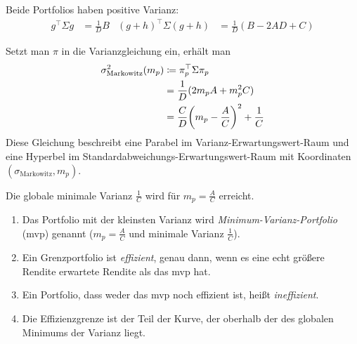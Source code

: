 \documentclass[a4paper,twoside,DIV15,BCOR12mm]{scrbook}
\begin{document}
Beide Portfolios haben positive Varianz:
\begin{align*}
g^\top \Sigma g &= \frac 1 D B &
(g+h)^\top \Sigma (g+h) &= \frac 1D (B- 2AD + C)
\end{align*}

Setzt man $\pi$ in die Varianzgleichung ein, erhält man 
\begin{align*}
\sigma^2_{\text{Markowitz}}(m_p) &\da \pi_p^\top \Sigma \pi_p \\
&= \frac 1 D (2m_pA + m_p^2C) \\
&= \frac C D \bigg(m_p - \frac AC\bigg)^2 + \frac 1C
\end{align*}
Diese Gleichung beschreibt eine Parabel im Varianz-Erwartungswert-Raum und eine Hyperbel im Standardabweichungs-Erwartungswert-Raum mit Koordinaten $(\sigma_{\text{Markowitz}},m_p)$.

Die globale minimale Varianz $\frac 1C$ wird für $m_p=\frac AC$ erreicht.

\begin{bemerkung}
\begin{enumerate}
\item Das Portfolio mit der kleinsten Varianz wird \emph{Minimum-Varianz-Portfolio} (mvp) genannt ($m_p=\frac AC$ und minimale Varianz $\frac 1C$).
\item Ein Grenzportfolio ist \emph{effizient}, genau dann, wenn es eine echt größere Rendite erwartete Rendite als das mvp hat.
\item Ein Portfolio, dass weder das mvp noch effizient ist, heißt \emph{ineffizient}.
\item Die Effizienzgrenze ist der Teil der Kurve, der oberhalb der des globalen Minimums der Varianz liegt.
\end{enumerate}
\end{bemerkung}

\begin{center}
\end{center}
\end{document}
